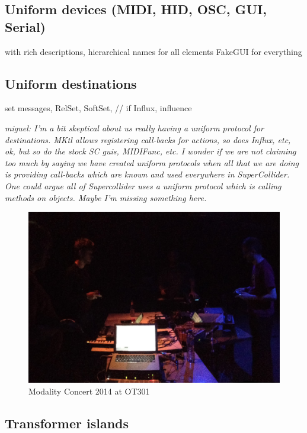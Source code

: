 \documentclass{article}
\begin{document}
\subsection{ Uniform devices (MIDI, HID, OSC, GUI, Serial) }

		with rich descriptions, hierarchical names for all elements
		FakeGUI for everything


\subsection{ Uniform destinations}

		set messages, RelSet, SoftSet, // if Influx, influence

\emph{ miguel: I'm a bit skeptical about us really having a uniform protocol for destinations. MKtl allows registering call-backs for actions, so does Influx, etc, ok, but so do the stock SC guis, MIDIFunc, etc.  I wonder if we are not claiming too much by saying we have created uniform protocols when all that we are doing is providing call-backs which are known and used everywhere in SuperCollider. One could argue all of Supercollider uses a uniform protocol which is calling methods on objects. Maybe I'm missing something here.
}
 
		
\begin{figure}[h]
	\centering
		\includegraphics[width=.9\columnwidth]{../media/20140405-IMG_1691.jpg}
	\caption{Modality Concert 2014 at OT301}
	\label{fig:media_20140405-IMG_1691}
\end{figure}

\subsection{Transformer islands} 
\end{document}

